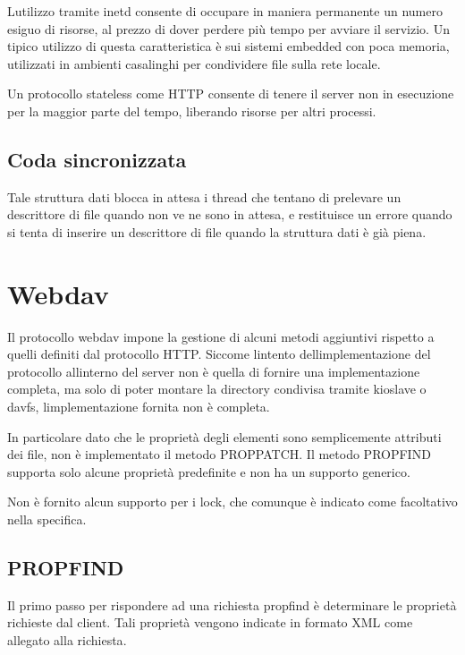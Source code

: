 \documentclass[a4paper,11pt]{article}
\begin{document}
\bigskip

{\sffamily
L{\textquotesingle}utilizzo tramite inetd consente di occupare in
maniera permanente un numero esiguo di risorse, al prezzo di dover
perdere pi\`u tempo per avviare il servizio\cite{LSB02}. Un tipico utilizzo
di questa caratteristica \`e sui sistemi embedded con poca memoria,
utilizzati in ambienti casalinghi per condividere file sulla rete
locale.}

{\sffamily
Un protocollo stateless come HTTP consente di tenere il server non in
esecuzione per la maggior parte del tempo, liberando risorse per altri
processi.}


\bigskip

\subsection[Coda sincronizzata]{Coda sincronizzata}
{\sffamily
Tale struttura dati blocca in attesa i thread che tentano di prelevare
un descrittore di file quando non ve ne sono in attesa, e restituisce
un errore quando si tenta di inserire un descrittore di file quando la
struttura dati \`e gi\`a piena.}


\bigskip

\section{Webdav}
{\sffamily
Il protocollo webdav impone la gestione di alcuni metodi aggiuntivi
rispetto a quelli definiti dal protocollo HTTP. Siccome
l{\textquotesingle}intento dell{\textquotesingle}implementazione del
protocollo all{\textquotesingle}interno del server non \`e quella di
fornire una implementazione completa, ma solo di poter montare la
directory condivisa tramite kioslave o davfs,
l{\textquotesingle}implementazione fornita non \`e completa.}


\bigskip

{\sffamily
In particolare dato che le propriet\`a degli elementi sono semplicemente
attributi dei file, non \`e implementato il metodo PROPPATCH. Il metodo
PROPFIND supporta solo alcune propriet\`a predefinite e non ha un
supporto generico.}


\bigskip

{\sffamily
Non \`e fornito alcun supporto per i lock, che comunque \`e indicato
come facoltativo nella specifica\cite{STD02}.}


\bigskip

\subsection{PROPFIND}
{\sffamily
Il primo passo per rispondere ad una richiesta propfind \`e determinare
le propriet\`a richieste dal client. Tali propriet\`a vengono indicate
in formato XML come allegato alla richiesta\cite{STD03}.}
\end{document}

